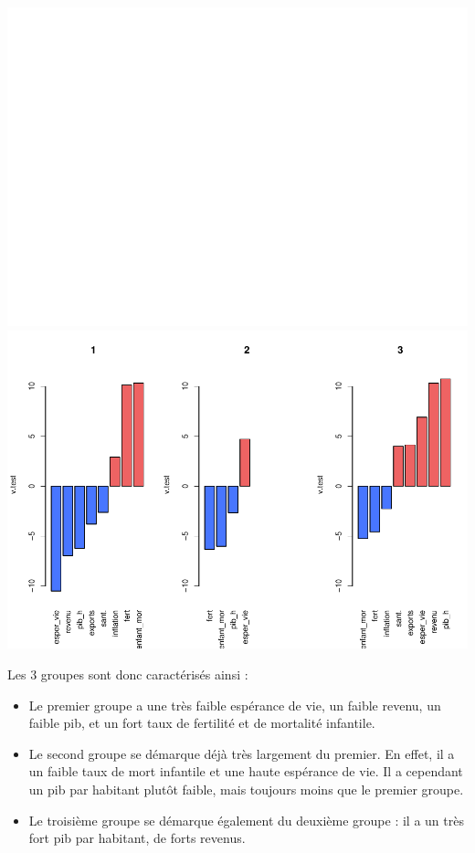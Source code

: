 \documentclass[
]{article}
\begin{document}
\includegraphics{Projet_files/figure-latex/unnamed-chunk-27-1.pdf}
\includegraphics{Projet_files/figure-latex/unnamed-chunk-27-2.pdf}

Les 3 groupes sont donc caractérisés ainsi :

\begin{itemize}
\item
  Le premier groupe a une très faible espérance de vie, un faible
  revenu, un faible pib, et un fort taux de fertilité et de mortalité
  infantile.
\item
  Le second groupe se démarque déjà très largement du premier. En effet,
  il a un faible taux de mort infantile et une haute espérance de vie.
  Il a cependant un pib par habitant plutôt faible, mais toujours moins
  que le premier groupe.
\item
  Le troisième groupe se démarque également du deuxième groupe : il a un
  très fort pib par habitant, de forts revenus.
\end{itemize}
\end{document}

